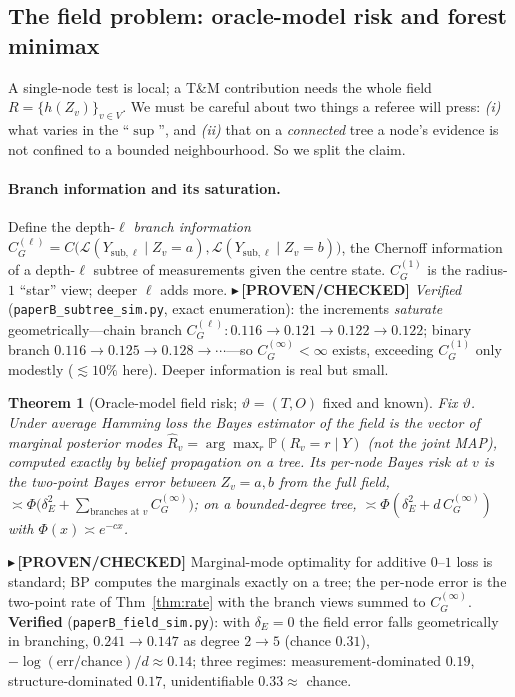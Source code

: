 \documentclass[11pt]{article}
\newtheorem{theorem}{Theorem}
\newcommand{\PROVEN}[1]{{\color{teal}\small$\blacktriangleright$\,\textbf{[PROVEN/CHECKED]} #1}}
\renewcommand{\Pr}{\mathbb{P}}\newcommand{\I}{\mathbb{I}}\newcommand{\HH}{\mathbb{H}}
\begin{document}
\subsection{The field problem: oracle-model risk and forest minimax}\label{sec:field}
A single-node test is local; a T\&M contribution needs the whole field $R=\{h(Z_v)\}_{v\in V}$. We must be careful
about two things a referee will press: \emph{(i)} what varies in the ``$\sup$'', and \emph{(ii)} that on a
\emph{connected} tree a node's evidence is not confined to a bounded neighbourhood. So we split the claim.

\paragraph{Branch information and its saturation.} Define the depth-$\ell$ \emph{branch information}
$C_G^{(\ell)}=C\big(\mathcal L(Y_{\mathrm{sub},\ell}\mid Z_v{=}a),\mathcal L(Y_{\mathrm{sub},\ell}\mid Z_v{=}b)\big)$,
the Chernoff information of a depth-$\ell$ subtree of measurements given the centre state. $C_G^{(1)}$ is the
radius-$1$ ``star'' view; deeper $\ell$ adds more.
\PROVEN{\emph{Verified} (\texttt{paperB\_subtree\_sim.py}, exact enumeration): the increments \emph{saturate}
geometrically---chain branch $C_G^{(\ell)}:0.116\to0.121\to0.122\to0.122$; binary branch
$0.116\to0.125\to0.128\to\cdots$---so $C_G^{(\infty)}<\infty$ exists, exceeding $C_G^{(1)}$ only modestly
($\lesssim 10\%$ here). Deeper information is real but small.}

\begin{theorem}[Oracle-model field risk; $\vartheta=(T,O)$ fixed and known]\label{thm:field}
Fix $\vartheta$. Under average Hamming loss the Bayes estimator of the field is the vector of \emph{marginal
posterior modes} $\hat R_v=\arg\max_r\Pr(R_v{=}r\mid Y)$ (\emph{not} the joint MAP), computed exactly by belief
propagation on a tree. Its per-node Bayes risk at $v$ is the two-point Bayes error between $Z_v{=}a,b$ from the
\emph{full} field, $\asymp\Phi\big(\delta_E^2+\sum_{\text{branches at }v}C_G^{(\infty)}\big)$; on a bounded-degree
tree, $\asymp\Phi(\delta_E^2+d\,C_G^{(\infty)})$ with $\Phi(x)\asymp e^{-cx}$.
\end{theorem}
\PROVEN{Marginal-mode optimality for additive $0$--$1$ loss is standard; BP computes the marginals exactly on a
tree; the per-node error is the two-point rate of Thm~\ref{thm:rate} with the branch views summed to
$C_G^{(\infty)}$. \textbf{Verified} (\texttt{paperB\_field\_sim.py}): with $\delta_E{=}0$ the field error falls
geometrically in branching, $0.241\!\to\!0.147$ as degree $2\!\to\!5$ (chance $0.31$),
$-\log(\text{err}/\text{chance})/d\approx0.14$; three regimes: measurement-dominated $0.19$, structure-dominated
$0.17$, unidentifiable $0.33\approx$ chance.}
\end{document}
